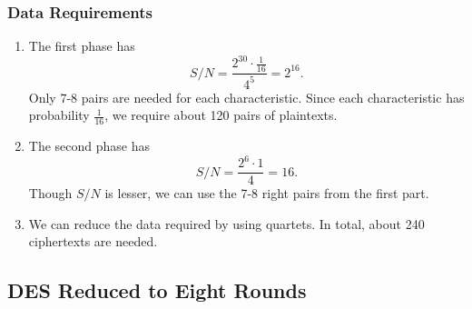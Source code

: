 \documentclass{beamer}
\begin{document}
    \begin{frame}
        \frametitle{Data Requirements}
        \begin{enumerate}
            \item<1-> The first phase has
            \begin{equation}
                S/N = \frac{2^{30} \cdot \frac{1}{16}}{4^5} = 2^{16}.
            \end{equation}
            Only 7-8 pairs are needed for each characteristic. Since each
            characteristic has probability \(\frac{1}{16}\), we require about
            120 pairs of plaintexts.
            \item<2-> The second phase has
            \begin{equation}
                S/N = \frac{2^6 \cdot 1}{4} = 16.
            \end{equation}
            Though \(S/N\) is lesser, we can use the 7-8 right pairs from the
            first part.
            \item<3-> We can reduce the data required by using quartets. In
            total, about 240 ciphertexts are needed. 
        \end{enumerate}
    \end{frame}

    \subsection{DES Reduced to Eight Rounds}
    \label{subsec:des-8rd}
\end{document}
